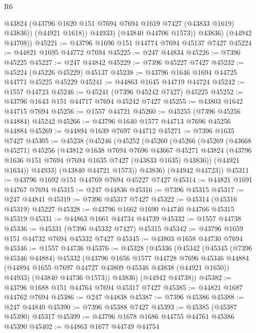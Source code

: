 \begin{lexlean}{R6}
\begin{coremodule}
                @43824
                (@43796 @1620 @151 @7694 @7694 @1619 @7427 (@43833 @1619) @43836))
              (@44921 @1618))
            @44933)
          (@43840 @44706 @1573))
        @43836)
      (@44942 @44708))
@45221 := @43796 @1696 @151 @44774 @7694 @45137 @7427
@45224 := @44821 @1695 @44772 @7694
@45225 := @247 @44834
@45226 := @7396 @45225
@45227 := @247 @44842
@45229 := @7396 @45227 @7427
@45232 := @45224 (@45226 @45229) @45137
@45238 := @43796 @1646 @1694 @44725 @44771 @45225 @45229
@45241 := @44863 @1645 @44719 @44724
@45242 := @1557 @44723
@45246 := @45241 (@7396 @45242 @7427) @45225
@45252 := @43796 @1643 @151 @44717 @7694 @45242 @7427
@45255 := @43803 @1642 @44715 @7694
@45256 := @1557 @44721
@45260 := @45255 (@7396 @45256 @44884) @45242
@45266 := @43796 @1640 @1577 @44713 @7696 @45256 @44884
@45269 := @44894 @1639 @7697 @44712
@45271 := @7396 @1635 @7427
@45305 := @45238
    (@45246
      (@45252
        (@45260
          (@45266
            (@45269
              (@43668 @45271)
              @45256
              (@43812
                @1638
                @7694
                @7696
                @43667
                @45271
                @43824
                (@43796 @1636 @151 @7694 @7694 @1635 @7427 (@43833 @1635) @43836))
              (@44921 @1634))
            @44933)
          (@43840 @44721 @1573))
        @43836)
      (@44942 @44723))
@45311 := @43796 @1692 @151 @44769 @7694 @45227 @7427
@45314 := @44821 @1691 @44767 @7694
@45315 := @247 @44836
@45316 := @7396 @45315
@45317 := @247 @44841
@45319 := @7396 @45317 @7427
@45322 := @45314 (@45316 @45319) @45227
@45328 := @43796 @1662 @1690 @44740 @44766 @45315 @45319
@45331 := @44863 @1661 @44734 @44739
@45332 := @1557 @44738
@45336 := @45331 (@7396 @45332 @7427) @45315
@45342 := @43796 @1659 @151 @44732 @7694 @45332 @7427
@45345 := @43803 @1658 @44730 @7694
@45346 := @1557 @44736
@45376 := @45328
    (@45336
      (@45342
        (@45345
          (@7396 @45346 @44884)
          @45332
          (@43796
            @1656
            @1577
            @44728
            @7696
            @45346
            @44884
            (@44894 @1655 @7697 @44727 @43809 @45346 @43838 (@44921 @1650))
            @44933)
          (@43840 @44736 @1573))
        @43836)
      (@44942 @44738))
@45382 := @43796 @1688 @151 @44764 @7694 @45317 @7427
@45385 := @44821 @1687 @44762 @7694
@45386 := @247 @44838
@45387 := @7396 @45386
@45388 := @247 @44840
@45390 := @7396 @45388 @7427
@45393 := @45385 (@45387 @45390) @45317
@45399 := @43796 @1678 @1686 @44755 @44761 @45386 @45390
@45402 := @44863 @1677 @44749 @44754

\end{coremodule}
\end{lexlean}
